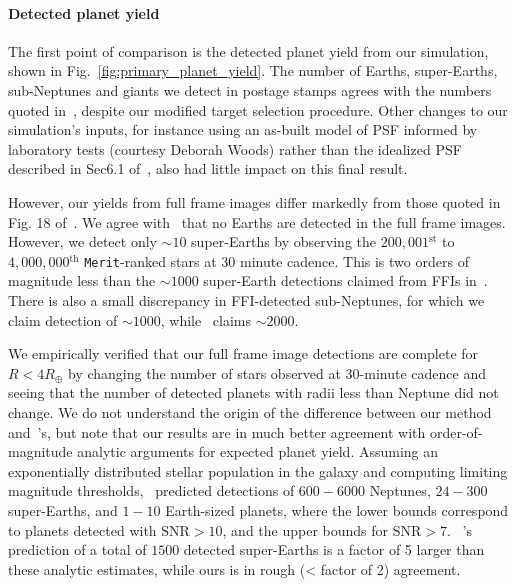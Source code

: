 \paragraph{Detected planet yield}
The first point of comparison is the detected planet yield from our simulation, shown in Fig.~\ref{fig:primary_planet_yield}.
The number of Earths, super-Earths, sub-Neptunes and giants we detect in postage stamps agrees with the numbers quoted in~, despite our modified target selection procedure.
Other changes to our simulation's inputs, for instance using an as-built model of \tesss PSF informed by laboratory tests (courtesy Deborah Woods) rather than the idealized PSF described in Sec6.1 of~, also had little impact on this final result.

However, our yields from full frame images differ markedly from those quoted in Fig. 18 of~.
We agree with~ that no Earths are detected in the full frame images.
However, we detect only $\sim10$ super-Earths by observing the $200,001\mathrm{^{st}}$ to $4,000,000\mathrm{^{th}}$ \texttt{Merit}-ranked stars at 30 minute cadence.
This is two orders of magnitude less than the $\sim1000$ super-Earth detections claimed from FFIs in~.
There is also a small discrepancy in FFI-detected sub-Neptunes, for which we claim detection of $\sim1000$, while~ claims $\sim2000$.

We empirically verified that our full frame image detections are complete for $R < 4R_\oplus$ by changing the number of stars observed at 30-minute cadence and seeing that the number of detected planets with radii less than Neptune did not change.
We do not understand the origin of the difference between our method and~'s, but note that our results are in much better agreement with order-of-magnitude analytic arguments for \tesss expected planet yield.
Assuming an exponentially distributed stellar population in the galaxy and computing limiting magnitude thresholds,~\citet{winn_searchable_2013} predicted detections of $600-6000$ Neptunes, $24-300$ super-Earths, and $1-10$ Earth-sized planets, where the lower bounds correspond to planets detected with $\mathrm{SNR}>10$, and the upper bounds for $\mathrm{SNR}>7$.
~'s prediction of a total of $1500$ detected super-Earths is a factor of 5 larger than these analytic estimates, while ours is in rough (< factor of 2) agreement.

